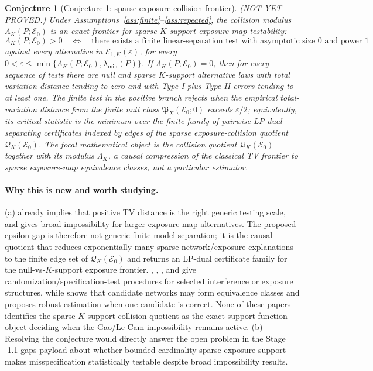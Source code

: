\documentclass[11pt]{article}
\theoremstyle{definition}
\theoremstyle{plain}
\newtheorem{conjecture}{Conjecture}
\theoremstyle{remark}
\begin{document}
\begin{conjecture}[Conjecture 1: sparse exposure-collision frontier]\label{conj:frontier}
(NOT YET PROVED.)  Under Assumptions~\ref{ass:finite}--\ref{ass:repeated}, the collision modulus \(\Lambda_K(P;\mathcal E_0)\) is an exact frontier for sparse \(K\)-support exposure-map testability:
\[
\Lambda_K(P;\mathcal E_0)>0
\quad\Longleftrightarrow\quad
\text{there exists a finite linear-separation test with asymptotic size }0
\text{ and power }1
\]
against every alternative in \(\mathcal E_{1,K}(\varepsilon)\), for every \(0<\varepsilon\le\min\{\Lambda_K(P;\mathcal E_0),\lambda_{\min}(P)\}\).  If \(\Lambda_K(P;\mathcal E_0)=0\), then for every sequence of tests there are null and sparse \(K\)-support alternative laws with total variation distance tending to zero and with Type I plus Type II errors tending to at least one.  The finite test in the positive branch rejects when the empirical total-variation distance from the finite null class \(\mathfrak P_X(\mathcal E_0;0)\) exceeds \(\varepsilon/2\); equivalently, its critical statistic is the minimum over the finite family of pairwise LP-dual separating certificates indexed by edges of the sparse exposure-collision quotient \(\mathcal Q_K(\mathcal E_0)\).  The focal mathematical object is the collision quotient \(\mathcal Q_K(\mathcal E_0)\) together with its modulus \(\Lambda_K\), a causal compression of the classical \citet{LeCam1986} TV frontier to sparse exposure-map equivalence classes, not a particular estimator.
\end{conjecture}
\paragraph{Why this is new and worth studying.}
(a) \citet[Chapter~6]{LeCam1986} already implies that positive TV distance is the right generic testing scale, and \citet[abstract and main theorem]{GaoHarshawSavjeWang2026} gives broad impossibility for larger exposure-map alternatives.  The proposed epsilon-gap is therefore not generic finite-model separation; it is the causal quotient that reduces exponentially many sparse network/exposure explanations to the finite edge set of \(\mathcal Q_K(\mathcal E_0)\) and returns an LP-dual certificate family for the null-vs-\(K\)-support exposure frontier.  \citet[Sections~2--3]{HoshinoYanagi2023}, \citet[Sections~2--3]{BasseFellerToulis2019}, \citet[Sections~2--4]{PuelzBasseFellerToulis2022}, and \citet[Sections~2--4]{AtheyEcklesImbens2018} give randomization/specification-test procedures for selected interference or exposure structures, while \citet[Sections~4--5]{WeinsteinNevo2026} shows that candidate networks may form equivalence classes and proposes robust estimation when one candidate is correct.  None of these papers identifies the sparse \(K\)-support collision quotient as the exact support-function object deciding when the Gao/Le Cam impossibility remains active.  (b) Resolving the conjecture would directly answer the open problem in the Stage -1.1 gaps payload about whether bounded-cardinality sparse exposure support makes misspecification statistically testable despite broad impossibility results.
\end{document}
